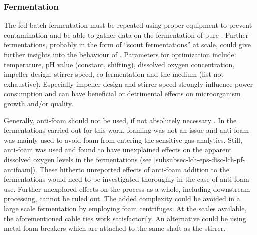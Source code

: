 \subsubsection{Fermentation}
The  fed-batch fermentation must be repeated using proper equipment to prevent contamination and be able to gather data on the fermentation of pure \strain{}. Further fermentations, probably in the form of \enquote{scout fermentations} at  scale, could give further insights into the behaviour of \strain{}. Parameters for optimization include: temperature, pH value (constant, shifting), dissolved oxygen concentration, impeller design, stirrer speed, co-fermentation and the medium (list not exhaustive). Especially impeller design and stirrer speed strongly influence power consumption and can have beneficial or detrimental effects on microorganism growth and/or \eps{} quality.

Generally, anti-foam should not be used, if not absolutely necessary \cite{Routledge2012}. In the fermentations carried out for this work, foaming was not an issue and anti-foam was mainly used to avoid foam from entering the sensitive gas analytics. Still, anti-foam was used and found to have unexplained effects on the apparent dissolved oxygen levels in the \lch{}  fermentations (see \vref{subsubsec-lch-eps-disc-lch-pf-antifoam}). These hitherto unreported effects of anti-foam addition to the \lch{} fermentations would need to be investigated thoroughly in the case of anti-foam use. Further unexplored effects on the process as a whole, including downstream processing, cannot be ruled out. The added complexity could be avoided in a large scale fermentation by employing foam centrifuges. At the scales available, the aforementioned cable ties \cite{Riedel2011} work satisfactorily. An alternative could be using metal foam breakers which are attached to the same shaft as the stirrer.

